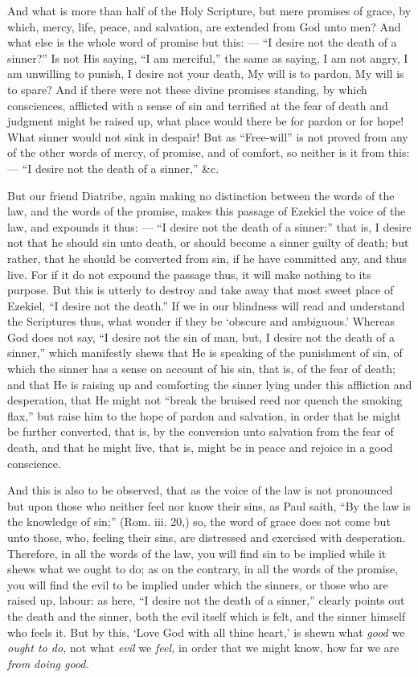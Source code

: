 And what is more than half of the Holy Scripture, but mere promises of grace, by which, mercy, life, peace, and salvation, are extended from God unto men? And what else is the whole word of promise but this: — “I desire not the death of a sinner?” Is not His saying, “I am merciful,” the same as saying, I am not angry, I am unwilling to punish, I desire not your death, My will is to pardon, My will is to spare? And if there were not these divine promises standing, by which consciences, afflicted with a sense of sin and terrified at the fear of death and judgment might be raised up, what place would there be for pardon or for hope! What sinner would not sink in despair! But as “Free-will” is not proved from any of the other words of mercy, of promise, and of comfort, so neither is it from this: — “I desire not the death of a sinner,” \&c.

But our friend Diatribe, again making no distinction between the words of the law, and the words of the promise, makes this passage of Ezekiel the voice of the law, and expounds it thus: — “I desire not the death of a sinner:” that is, I desire not that he should sin unto death, or should become a sinner guilty of death; but rather, that he should be converted from sin, if he have committed any, and thus live. For if it do not expound the passage thus, it will make nothing to its purpose. But this is utterly to destroy and take away that most sweet place of Ezekiel, “I desire not the death.” If we in our blindness will read and understand the Scriptures thus, what wonder if they be ‘obscure and ambiguous.’ Whereas God does not say, “I desire not the sin of man, but, I desire not the death of a sinner,” which manifestly shews that He is speaking of the punishment of sin, of which the sinner has a sense on account of his sin, that is, of the fear of death; and that He is raising up and comforting the sinner lying under this affliction and desperation, that He might not “break the bruised reed nor quench the smoking flax,” but raise him to the hope of pardon and salvation, in order that he might be further converted, that is, by the conversion unto salvation from the fear of death, and that he might live, that is, might be in peace and rejoice in a good conscience.

And this is also to be observed, that as the voice of the law is not pronounced but upon those who neither feel nor know their sins, as Paul saith, “By the law is the knowledge of sin;” (Rom. iii. 20,) so, the word of grace does not come but unto those, who, feeling their sins, are distressed and exercised with desperation. Therefore, in all the words of the law, you will find sin to be implied while it shews what we ought to do; as on the contrary, in all the words of the promise, you will find the evil to be implied under which the sinners, or those who are raised up, labour: as here, “I desire not the death of a sinner,” clearly points out the death and the sinner, both the evil itself which is felt, and the sinner himself who feels it. But by this, ‘Love God with all thine heart,’ is shewn what \emph{good }we \emph{ought to do, }not what \emph{evil} we \emph{feel, }in order that we might know, how far we are \emph{from doing good.}

